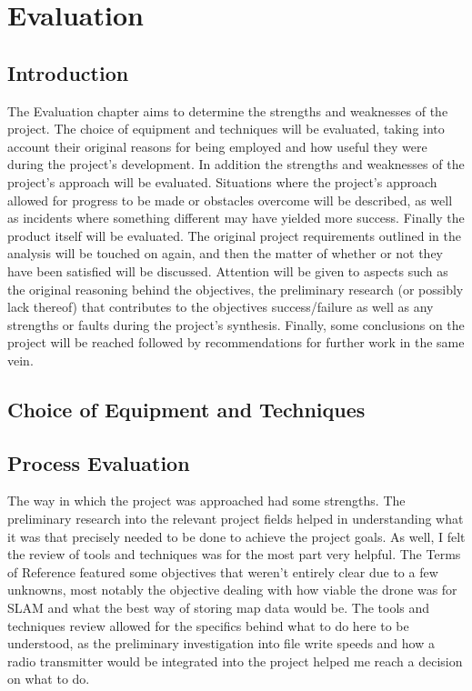 \part{Evaluation}
	\chapter{Introduction}
	The Evaluation chapter aims to determine the strengths and weaknesses of the project. The choice of equipment and techniques will be evaluated, taking into account their original reasons for being employed and how useful they were during the project's development. In addition the strengths and weaknesses of the project's approach will be evaluated. Situations where the project's approach allowed for progress to be made or obstacles overcome will be described, as well as incidents where something different may have yielded more success. Finally the product itself will be evaluated. The original project requirements outlined in the analysis will be touched on again, and then the matter of whether or not they have been satisfied will be discussed. Attention will be given to aspects such as the original reasoning behind the objectives, the preliminary research (or possibly lack thereof) that contributes to the objectives success/failure as well as any strengths or faults during the project's synthesis. Finally, some conclusions on the project will be reached followed by recommendations for further work in the same vein. 
	
	\chapter{Choice of Equipment and Techniques}
	
	
	
	\chapter{Process Evaluation}
	\label{evaluation:processevaluation}
	
	The way in which the project was approached had some strengths. The preliminary research into the relevant project fields helped in understanding what it was that precisely needed to be done to achieve the project goals. As well, I felt the review of tools and techniques was for the most part very helpful. The Terms of Reference featured some objectives that weren't entirely clear due to a few unknowns, most notably the objective dealing with how viable the drone was for SLAM and what the best way of storing map data would be. The tools and techniques review allowed for the specifics behind what to do here to be understood, as the preliminary investigation into file write speeds and how a radio transmitter would be integrated into the project helped me reach a decision on what to do.
	
